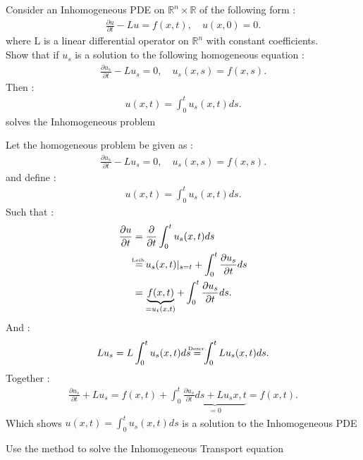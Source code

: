 \begin{question}[subtitle=Duhamel's Principle (1)]
  Consider an Inhomogeneous PDE on $\mathbb{R}^{n} \times  \mathbb{R} $ of the following form : 
  \begin{align*}
    \frac{\partial u}{\partial t}  - Lu = f(x,t), \quad u(x,0) = 0
  .\end{align*}
  where L is a linear differential operator on $\mathbb{R}^{n} $ with constant coefficients.\\
  Show that if $u_s$ is a solution to the following homogeneous equation : 
  \begin{align*}
    \frac{\partial u_s}{\partial t}  - Lu_s = 0 , \quad u_s(x,s) = f(x,s)
  .\end{align*}
  Then : 
  \begin{align*}
    u(x,t) = \int_0^t u_s(x,t) ds 
  .\end{align*}
  solves the Inhomogeneous problem
\end{question}
\begin{solution}
 Let the homogeneous problem be given as : 
  \begin{align*}
    \frac{\partial u_s}{\partial t}  - Lu_s = 0 , \quad u_s(x,s) = f(x,s)
  .\end{align*}
 and define : 
 \begin{align*}
  u(x,t) = \int_0^t u_s(x,t) ds
 .\end{align*}
 Such that : 
 \begin{align*}
   \frac{\partial u}{\partial t}  &= \frac{\partial }{\partial t}  \int_0^t u_s(x,t) ds\\ 
                                  &\myS{Leib.}{=} u_s(x,t)\vert_{s=t} + \int_0^t \frac{\partial u_s}{\partial t} ds  \\
                                  &= \underbrace{f(x,t)}_{=u_t(x,t)} + \int_0^t  \frac{\partial u_s}{\partial t} ds 
 .\end{align*}
And : 
\begin{align*}
  L u_s =  L \int_0^t u_s(x,t) ds  \myS{Descr.}{=} \int_0^t L u_s(x,t) ds
.\end{align*}
Together : 
\begin{align*}
  \frac{\partial u_s}{\partial t} + L u_s =  f(x,t) + \int_0^t \underbrace{\frac{\partial u_s}{\partial t} ds + L u_s{x,t}}_{=0} =  f(x,t)
.\end{align*}
Which shows $u(x,t) = \int_0^t u_s(x,t) ds$ is a solution to the Inhomogeneous PDE
\end{solution}
\begin{question}[subtitle=Duhamel's Principle (2)]
Use the method to solve the Inhomogeneous Transport equation
\end{question}
